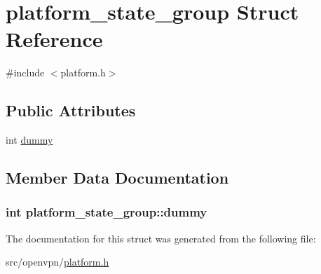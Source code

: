 \hypertarget{structplatform__state__group}{}\section{platform\+\_\+state\+\_\+group Struct Reference}
\label{structplatform__state__group}


{\ttfamily \#include $<$platform.\+h$>$}

\subsection*{Public Attributes}
\begin{DoxyCompactItemize}
\item 
int \hyperlink{structplatform__state__group_ae1ff2dec21ca25e161d54168e6d48c0e}{dummy}
\end{DoxyCompactItemize}


\subsection{Member Data Documentation}
\hypertarget{structplatform__state__group_ae1ff2dec21ca25e161d54168e6d48c0e}{}
\subsubsection[{dummy}]{\setlength{\rightskip}{0pt plus 5cm}int platform\+\_\+state\+\_\+group\+::dummy}\label{structplatform__state__group_ae1ff2dec21ca25e161d54168e6d48c0e}


The documentation for this struct was generated from the following file\+:\begin{DoxyCompactItemize}
\item 
src/openvpn/\hyperlink{platform_8h}{platform.\+h}\end{DoxyCompactItemize}
